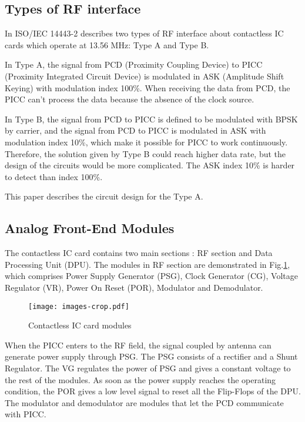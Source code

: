 \subsection{Types of RF interface}
In ISO/IEC 14443-2 describes two types of RF interface about contactless IC cards which operate at 13.56 MHz: Type A and Type B. 

In Type A, the signal from PCD (Proximity Coupling Device) to PICC (Proximity Integrated Circuit Device) is modulated in ASK (Amplitude Shift Keying) with modulation index 100\%. When receiving the data from PCD, the PICC can’t process the data because the absence of the clock source. 

In Type B,  the signal from PCD to PICC is defined to be modulated with BPSK by carrier, and the signal from PCD to PICC is modulated in ASK with modulation index 10\%, which make it possible for PICC to work continuously. Therefore, the solution given by Type B could reach higher data rate, but the design of the circuits would be more complicated. The ASK index 10\% is harder to detect than index 100\%.

This paper describes the circuit design for the Type A. 


\subsection{Analog Front-End Modules}

The contactless IC card contains two main sections \cite{rfid_interface}: RF section and Data Processing Unit (DPU). The modules in RF section are demonstrated in Fig.\ref{fig:modules}, which comprises Power Supply Generator (PSG), Clock Generator (CG), Voltage Regulator (VR), Power On Reset (POR), Modulator  and Demodulator. 

\begin{figure}[]
  \centering
  \texttt{[image: images-crop.pdf]}
  \caption{Contactless IC card modules}
  \label{fig:modules}
\end{figure}

When the PICC enters to the RF field, the signal coupled by antenna can generate power supply through PSG. The PSG consists of a rectifier and a Shunt Regulator. The VG regulates the power of PSG and gives a constant voltage to the rest of the modules. As soon as the power supply reaches the operating condition, the POR gives a low level signal to reset all the Flip-Flops of the DPU. The modulator and demodulator are modules that let the PCD communicate with PICC.